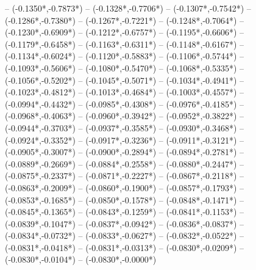{	-- ({-0.1350*\dx},{-0.7873*\dy})
	-- ({-0.1328*\dx},{-0.7706*\dy})
	-- ({-0.1307*\dx},{-0.7542*\dy})
	-- ({-0.1286*\dx},{-0.7380*\dy})
	-- ({-0.1267*\dx},{-0.7221*\dy})
	-- ({-0.1248*\dx},{-0.7064*\dy})
	-- ({-0.1230*\dx},{-0.6909*\dy})
	-- ({-0.1212*\dx},{-0.6757*\dy})
	-- ({-0.1195*\dx},{-0.6606*\dy})
	-- ({-0.1179*\dx},{-0.6458*\dy})
	-- ({-0.1163*\dx},{-0.6311*\dy})
	-- ({-0.1148*\dx},{-0.6167*\dy})
	-- ({-0.1134*\dx},{-0.6024*\dy})
	-- ({-0.1120*\dx},{-0.5883*\dy})
	-- ({-0.1106*\dx},{-0.5744*\dy})
	-- ({-0.1093*\dx},{-0.5606*\dy})
	-- ({-0.1080*\dx},{-0.5470*\dy})
	-- ({-0.1068*\dx},{-0.5335*\dy})
	-- ({-0.1056*\dx},{-0.5202*\dy})
	-- ({-0.1045*\dx},{-0.5071*\dy})
	-- ({-0.1034*\dx},{-0.4941*\dy})
	-- ({-0.1023*\dx},{-0.4812*\dy})
	-- ({-0.1013*\dx},{-0.4684*\dy})
	-- ({-0.1003*\dx},{-0.4557*\dy})
	-- ({-0.0994*\dx},{-0.4432*\dy})
	-- ({-0.0985*\dx},{-0.4308*\dy})
	-- ({-0.0976*\dx},{-0.4185*\dy})
	-- ({-0.0968*\dx},{-0.4063*\dy})
	-- ({-0.0960*\dx},{-0.3942*\dy})
	-- ({-0.0952*\dx},{-0.3822*\dy})
	-- ({-0.0944*\dx},{-0.3703*\dy})
	-- ({-0.0937*\dx},{-0.3585*\dy})
	-- ({-0.0930*\dx},{-0.3468*\dy})
	-- ({-0.0924*\dx},{-0.3352*\dy})
	-- ({-0.0917*\dx},{-0.3236*\dy})
	-- ({-0.0911*\dx},{-0.3121*\dy})
	-- ({-0.0905*\dx},{-0.3007*\dy})
	-- ({-0.0900*\dx},{-0.2894*\dy})
	-- ({-0.0894*\dx},{-0.2781*\dy})
	-- ({-0.0889*\dx},{-0.2669*\dy})
	-- ({-0.0884*\dx},{-0.2558*\dy})
	-- ({-0.0880*\dx},{-0.2447*\dy})
	-- ({-0.0875*\dx},{-0.2337*\dy})
	-- ({-0.0871*\dx},{-0.2227*\dy})
	-- ({-0.0867*\dx},{-0.2118*\dy})
	-- ({-0.0863*\dx},{-0.2009*\dy})
	-- ({-0.0860*\dx},{-0.1900*\dy})
	-- ({-0.0857*\dx},{-0.1793*\dy})
	-- ({-0.0853*\dx},{-0.1685*\dy})
	-- ({-0.0850*\dx},{-0.1578*\dy})
	-- ({-0.0848*\dx},{-0.1471*\dy})
	-- ({-0.0845*\dx},{-0.1365*\dy})
	-- ({-0.0843*\dx},{-0.1259*\dy})
	-- ({-0.0841*\dx},{-0.1153*\dy})
	-- ({-0.0839*\dx},{-0.1047*\dy})
	-- ({-0.0837*\dx},{-0.0942*\dy})
	-- ({-0.0836*\dx},{-0.0837*\dy})
	-- ({-0.0834*\dx},{-0.0732*\dy})
	-- ({-0.0833*\dx},{-0.0627*\dy})
	-- ({-0.0832*\dx},{-0.0522*\dy})
	-- ({-0.0831*\dx},{-0.0418*\dy})
	-- ({-0.0831*\dx},{-0.0313*\dy})
	-- ({-0.0830*\dx},{-0.0209*\dy})
	-- ({-0.0830*\dx},{-0.0104*\dy})
	-- ({-0.0830*\dx},{-0.0000*\dy})
}
